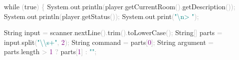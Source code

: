 \documentclass[
  justified,
  openright,
]{tufte-book}
\newcommand{\BuiltInTok}[1]{#1}
\newcommand{\ControlFlowTok}[1]{\textcolor{BrandBlue}{#1}}
\newcommand{\DecValTok}[1]{\textcolor{Purple}{#1}}
\newcommand{\FunctionTok}[1]{\textcolor{BrandBlue}{#1}}
\newcommand{\KeywordTok}[1]{\textcolor{BrandBlue}{#1}}
\newcommand{\NormalTok}[1]{#1}
\newcommand{\OperatorTok}[1]{\textcolor{DarkGray}{#1}}
\newcommand{\SpecialCharTok}[1]{\textcolor{Teal}{#1}}
\newcommand{\StringTok}[1]{\textcolor{Teal}{#1}}
\newenvironment{Shaded}{%
  \begin{snugshade}
}{%
  \end{snugshade}
}
\begin{document}
\begin{Shaded}
\begin{Highlighting}[]
        \ControlFlowTok{while} \OperatorTok{(}\KeywordTok{true}\OperatorTok{)} \OperatorTok{\{}
            \BuiltInTok{System}\OperatorTok{.}\FunctionTok{out}\OperatorTok{.}\FunctionTok{println}\OperatorTok{(}\NormalTok{player}\OperatorTok{.}\FunctionTok{getCurrentRoom}\OperatorTok{().}\FunctionTok{getDescription}\OperatorTok{());}
            \BuiltInTok{System}\OperatorTok{.}\FunctionTok{out}\OperatorTok{.}\FunctionTok{println}\OperatorTok{(}\NormalTok{player}\OperatorTok{.}\FunctionTok{getStatus}\OperatorTok{());}
            \BuiltInTok{System}\OperatorTok{.}\FunctionTok{out}\OperatorTok{.}\FunctionTok{print}\OperatorTok{(}\StringTok{"}\SpecialCharTok{\textbackslash{}n}\StringTok{\textgreater{} "}\OperatorTok{);}

            \BuiltInTok{String}\NormalTok{ input }\OperatorTok{=}\NormalTok{ scanner}\OperatorTok{.}\FunctionTok{nextLine}\OperatorTok{().}\FunctionTok{trim}\OperatorTok{().}\FunctionTok{toLowerCase}\OperatorTok{();}
            \BuiltInTok{String}\OperatorTok{[]}\NormalTok{ parts }\OperatorTok{=}\NormalTok{ input}\OperatorTok{.}\FunctionTok{split}\OperatorTok{(}\StringTok{"}\SpecialCharTok{\textbackslash{}\textbackslash{}}\StringTok{s+"}\OperatorTok{,} \DecValTok{2}\OperatorTok{);}
            \BuiltInTok{String}\NormalTok{ command }\OperatorTok{=}\NormalTok{ parts}\OperatorTok{[}\DecValTok{0}\OperatorTok{];}
            \BuiltInTok{String}\NormalTok{ argument }\OperatorTok{=}\NormalTok{ parts}\OperatorTok{.}\FunctionTok{length} \OperatorTok{\textgreater{}} \DecValTok{1} \OperatorTok{?}\NormalTok{ parts}\OperatorTok{[}\DecValTok{1}\OperatorTok{]} \OperatorTok{:} \StringTok{""}\OperatorTok{;}


\end{Highlighting}
\end{Shaded}
\end{document}
